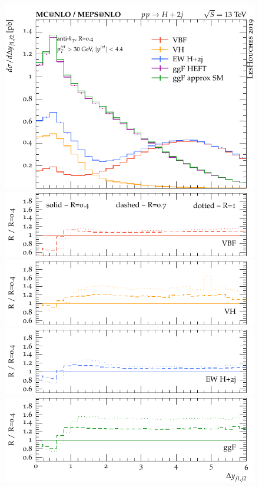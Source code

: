 \documentclass[10pt,prd,fleqn,superscriptaddress,notitlepage,nofootinbib,preprintnumbers,nobalancelastpage]{revtex4-1}
\begin{document}
\begin{figure}[p]
  \centering
  \begin{minipage}{.2925\textwidth}
    \includegraphics[width=\textwidth]{figures/channels/delta_y_jj12.pdf}
    \includegraphics[width=\textwidth]{figures/channels/delta_y_jj12_rVBF.pdf}
    \includegraphics[width=\textwidth]{figures/channels/delta_y_jj12_rVH.pdf}
    \includegraphics[width=\textwidth]{figures/channels/delta_y_jj12_rHJJ.pdf}
    \includegraphics[width=\textwidth]{figures/channels/delta_y_jj12_rGGH.pdf}

\end{minipage}
\end{figure}
\end{document}
